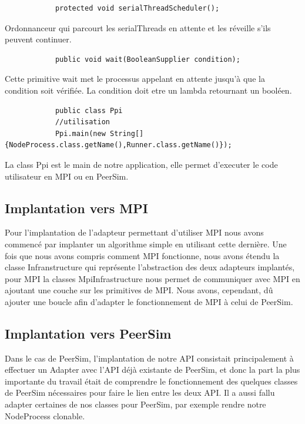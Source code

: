 \documentclass{article}
\begin{document}
			\begin{lstlisting}
			protected void serialThreadScheduler();
			\end{lstlisting}
			Ordonnanceur qui parcourt les serialThreads en attente et les réveille s'ils peuvent continuer.
			\vspace*{3mm}

			\begin{lstlisting}
			public void wait(BooleanSupplier condition);
			\end{lstlisting}
			Cette primitive wait met le processus appelant en attente jusqu'à que la condition soit vérifiée.
			La condition doit etre un lambda retournant un booléen.
			\vspace*{3mm}

			\begin{lstlisting}
			public class Ppi
			//utilisation
			Ppi.main(new String[] {NodeProcess.class.getName(),Runner.class.getName()});
			\end{lstlisting}
			La class Ppi est le main de notre application, elle permet d'executer le code utilisateur en MPI ou en PeerSim.

			\subsection{Implantation vers MPI}
			Pour l'implantation de l'adapteur permettant d'utiliser MPI nous avons commencé par implanter un algorithme simple en utilisant cette dernière.
			Une fois que nous avons compris comment MPI fonctionne, nous avons étendu la classe Infranstructure qui représente l'abstraction des deux adapteurs implantés, pour MPI la classes MpiInfrastructure nous permet de communiquer avec MPI en ajoutant  une couche sur les primitives de MPI.
			Nous avons, cependant, dû ajouter une boucle  afin d'adapter le fonctionnement de MPI à celui de PeerSim.
			\subsection{Implantation vers PeerSim}
			Dans le cas de PeerSim, l'implantation de notre API consistait principalement à effectuer un Adapter avec l'API déjà existante de PeerSim, et donc la part la plus importante du travail était de comprendre le fonctionnement des quelques classes de PeerSim nécessaires pour faire le lien entre les deux API. Il a aussi fallu adapter certaines de nos classes pour PeerSim, par exemple rendre notre NodeProcess clonable. 
\end{document}

